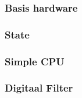 \documentclass{paper}
\begin{document}
\subsubsection*{Basis hardware} %
\label{ssub:basis_hardware}


\subsubsection*{State} %
\label{ssub:state}


\subsubsection*{Simple CPU} %
\label{ssub:simple_cpu}


\subsubsection*{Digitaal Filter} %
\label{ssub:digitaal_filter}

\end{document}
